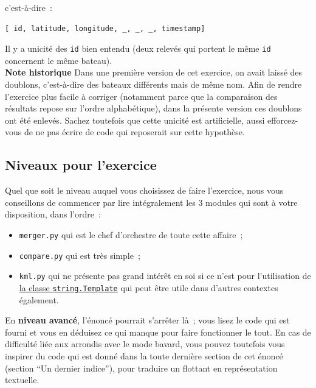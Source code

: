 c'est-à-dire~:

\begin{verbatim}
[ id, latitude, longitude, _, _, _, timestamp]
\end{verbatim}

    Il y a unicité des \texttt{id} bien entendu (deux relevés qui portent le
même \texttt{id} concernent le même bateau).\\

\textbf{Note historique} Dans une première version de cet exercice, on
avait laissé des doublons, c'est-à-dire des bateaux différents mais de
même nom. Afin de rendre l'exercice plus facile à corriger (notamment
parce que la comparaison des résultats repose sur l'ordre alphabétique),
dans la présente version ces doublons ont été enlevés. Sachez toutefois
que cette unicité est artificielle, aussi efforcez-vous de ne pas écrire
de code qui reposerait sur cette hypothèse.


    \hypertarget{niveaux-pour-lexercice}{%
\subsection{Niveaux pour l'exercice}\label{niveaux-pour-lexercice}}

    Quel que soit le niveau auquel vous choisissez de faire l'exercice, nous
vous conseillons de commencer par lire intégralement les 3 modules qui
sont à votre disposition, dans l'ordre~:

\begin{itemize}
\tightlist
\item
  \texttt{merger.py} qui est le chef d'orchestre de toute cette
  affaire~;
\item
  \texttt{compare.py} qui est très simple~;
\item
  \texttt{kml.py} qui ne présente pas grand intérêt en soi si ce n'est
  pour l'utilisation de
  \href{https://docs.python.org/3/library/string.html\#template-strings}{la
  classe \texttt{string.Template}} qui peut être utile dans d'autres
  contextes également.
\end{itemize}


    En \textbf{niveau avancé}, l'énoncé pourrait s'arrêter là~; vous lisez
le code qui est fourni et vous en déduisez ce qui manque pour faire
fonctionner le tout. En cas de difficulté liée aux arrondis avec le mode
bavard, vous pouvez toutefois vous inspirer du code qui est donné dans
la toute dernière section de cet énoncé (section ``Un dernier indice''),
pour traduire un flottant en représentation textuelle.\\

